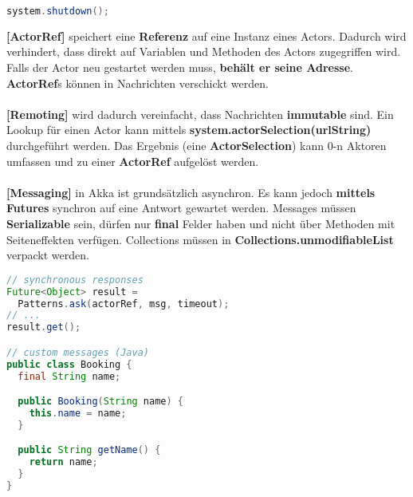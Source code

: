 \documentclass[8pt]{extarticle}
\let\oldtextbf\textbf
\renewcommand{\textbf}{\tiny\oldtextbf}
\begin{document}
\begin{multicols*}{5}
\begin{lstlisting}[language=java]
system.shutdown();
\end{lstlisting}
\textbf{[ActorRef]} speichert eine \textbf{Referenz} auf eine Instanz eines Actors. Dadurch wird verhindert, dass direkt auf Variablen und Methoden des Actors zugegriffen wird. Falls der Actor neu gestartet werden muss, \textbf{behält er seine Adresse}. \textbf{ActorRef}s können in Nachrichten verschickt werden.\\\\
\textbf{[Remoting]} wird dadurch vereinfacht, dass Nachrichten \textbf{immutable} sind. Ein Lookup für einen Actor kann mittels \textbf{system.actorSelection(urlString)} durchgeführt werden. Das Ergebnis (eine \textbf{ActorSelection}) kann 0-n Aktoren umfassen und zu einer \textbf{ActorRef} aufgelöst werden.\\\\
\textbf{[Messaging]} in Akka ist grundsätzlich asynchron. Es kann jedoch \textbf{mittels Futures} synchron auf eine Antwort gewartet werden. Messages müssen \textbf{Serializable} sein, dürfen nur \textbf{final} Felder haben und nicht über Methoden mit Seiteneffekten verfügen. Collections müssen in \textbf{Collections.unmodifiableList} verpackt werden.
\begin{lstlisting}[language=java]
// synchronous responses
Future<Object> result =
  Patterns.ask(actorRef, msg, timeout);
// ...
result.get();

// custom messages (Java)
public class Booking {
  final String name;

  public Booking(String name) {
    this.name = name;
  }

  public String getName() {
    return name;
  }
}


\end{lstlisting}
\end{multicols*}
\end{document}
